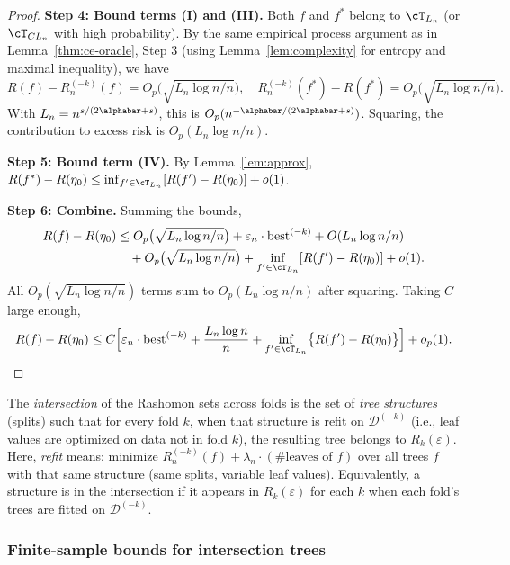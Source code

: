 \documentclass[12pt]{article}
\begin{document}
\begin{proof}
\noindent\textbf{Step 4: Bound terms (I) and (III).}
Both $f$ and $f^*$ belong to $\cT_{L_n}$ (or $\cT_{C L_n}$ with high probability). By the same empirical process argument as in Lemma~\ref{thm:ce-oracle}, Step 3 (using Lemma~\ref{lem:complexity} for entropy and maximal inequality), we have
\[
R(f) - R_n^{(-k)}(f) = O_p\bigl( \sqrt{L_n \log n / n} \bigr), \quad R_n^{(-k)}(f^*) - R(f^*) = O_p\bigl( \sqrt{L_n \log n / n} \bigr).
\]
With $L_n = n^{s/(2\alphabar+s)}$, this is $O_p(n^{-\alphabar/(2\alphabar+s)})$. Squaring, the contribution to excess risk is $O_p(L_n \log n / n)$.

\noindent\textbf{Step 5: Bound term (IV).}
By Lemma~\ref{lem:approx}, $R(f^*) - R(\eta_0) \le \inf_{f' \in \cT_{L_n}}[R(f') - R(\eta_0)] + o(1)$.

\noindent\textbf{Step 6: Combine.}
Summing the bounds,
\begin{align*}
R(f) - R(\eta_0) &\le O_p\bigl( \sqrt{L_n \log n / n} \bigr) + \varepsilon_n \cdot \text{best}^{(-k)} + O(L_n \log n / n) \\
&\quad + O_p\bigl( \sqrt{L_n \log n / n} \bigr) + \inf_{f' \in \cT_{L_n}}[R(f') - R(\eta_0)] + o(1).
\end{align*}
All $O_p(\sqrt{L_n \log n / n})$ terms sum to $O_p(L_n \log n / n)$ after squaring. Taking $C$ large enough,
\[
R(f) - R(\eta_0) \le C \Bigl[ \varepsilon_n \cdot \text{best}^{(-k)} + \frac{L_n \log n}{n} + \inf_{f' \in \cT_{L_n}} \bigl\{ R(f') - R(\eta_0) \bigr\} \Bigr] + o_p(1).
\]
\end{proof}

\begin{definition}
\label{def:intersection}
The \emph{intersection} of the Rashomon sets across folds is the set of \emph{tree structures} (splits) such that for every fold $k$, when that structure is refit on $\mathcal{D}^{(-k)}$ (i.e., leaf values are optimized on data not in fold $k$), the resulting tree belongs to $R_k(\varepsilon)$. Here, \emph{refit} means: minimize $R_n^{(-k)}(f) + \lambda_n \cdot (\#\text{leaves of } f)$ over all trees $f$ with that same structure (same splits, variable leaf values). Equivalently, a structure is in the intersection if it appears in $R_k(\varepsilon)$ for each $k$ when each fold's trees are fitted on $\mathcal{D}^{(-k)}$.
\end{definition}

\subsubsection{Finite-sample bounds for intersection trees}
\end{document}
